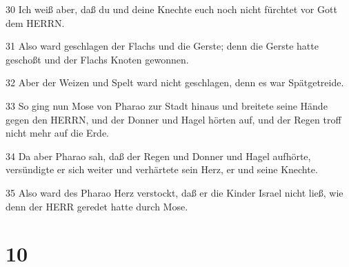 \par 30 Ich weiß aber, daß du und deine Knechte euch noch nicht fürchtet vor Gott dem HERRN.
\par 31 Also ward geschlagen der Flachs und die Gerste; denn die Gerste hatte geschoßt und der Flachs Knoten gewonnen.
\par 32 Aber der Weizen und Spelt ward nicht geschlagen, denn es war Spätgetreide.
\par 33 So ging nun Mose von Pharao zur Stadt hinaus und breitete seine Hände gegen den HERRN, und der Donner und Hagel hörten auf, und der Regen troff nicht mehr auf die Erde.
\par 34 Da aber Pharao sah, daß der Regen und Donner und Hagel aufhörte, versündigte er sich weiter und verhärtete sein Herz, er und seine Knechte.
\par 35 Also ward des Pharao Herz verstockt, daß er die Kinder Israel nicht ließ, wie denn der HERR geredet hatte durch Mose.

\chapter{10}

